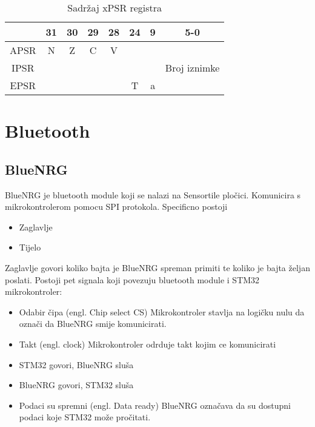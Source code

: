 \documentclass[times, utf8, diplomski]{fer}
\begin{document}
\begin{table}[h]
  \begin{center}
    \begin{tabular}{c|c|c|c|c||c||c||c|}
      \cline{2-8} & 31 & 30 & 29 & 28 & 24 & 9 & 5-0\\
      \hline
      \multicolumn{1}{|c|}{APSR} & N & Z & C & V & \multicolumn{3}{c|}{ } \\
      \hline
      \multicolumn{1}{|c|}{IPSR} & \multicolumn{6}{c||}{ } & Broj iznimke \\
      \hline
      \multicolumn{1}{|c|}{EPSR} & \multicolumn{4}{c||}{ } & T & a & \\
      \hline
    \end{tabular}
    \caption{Sadr\v{z}aj xPSR registra}
  \end{center}
\end{table}

\newpage
\section{Bluetooth}
\subsection{BlueNRG}
BlueNRG je bluetooth module koji se nalazi na Sensortile plo\v{c}ici. Komunicira s mikrokontrolerom pomocu SPI protokola.
Specificno postoji
\begin{itemize}
  \item Zaglavlje
  \item Tijelo
\end{itemize}
Zaglavlje govori koliko bajta je BlueNRG spreman primiti te koliko je bajta \v{z}eljan poslati.
Postoji pet signala koji povezuju bluetooth module i STM32 mikrokontroler:
\begin{itemize}
  \item Odabir \v{c}ipa (engl. Chip select CS) Mikrokontroler stavlja na logi\v{c}ku nulu da ozna\v{c}i da BlueNRG smije komunicirati.
  \item Takt (engl. clock) Mikrokontroler odrduje takt kojim ce komunicirati
  \item STM32 govori, BlueNRG slu\v{s}a
  \item BlueNRG govori, STM32 slu\v{s}a
  \item Podaci su spremni (engl. Data ready) BlueNRG ozna\v{c}ava da su dostupni podaci koje STM32 mo\v{z}e pro\v{c}itati.
\end{itemize}
\end{document}
